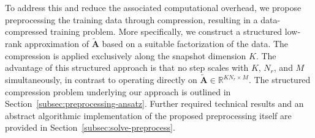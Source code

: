 \documentclass[onefignum,onetabnum]{siamart251104}
\newcommand{\bt}[1]{{\mathbf{#1}}}
\newcommand{\Nr}{{N_r}}
\newcommand{\R}{\mathbb{R}}
\newcommand{\Ap}{{\bt{A}}}
\begin{document}
To address this and reduce the associated computational overhead, we propose preprocessing the training data through compression, resulting in a data-compressed training problem.
More specifically, we construct a structured low-rank approximation of $\tilde{\Ap}$ based on a suitable factorization of the data.
The compression is applied exclusively along the snapshot dimension $K$.
The advantage of this structured approach is that no step scales with $K$, $\Nr$, and $M$ simultaneously, in contrast to operating directly on $\tilde{\Ap} \in \R^{K\Nr \times M}$.
The structured compression problem underlying our approach is outlined in Section~\ref{subsec:preprocessing-ansatz}. Further required technical results and an abstract algorithmic implementation of the proposed preprocessing itself are provided in Section~\ref{subsec:solve-preprocess}.
\end{document}
